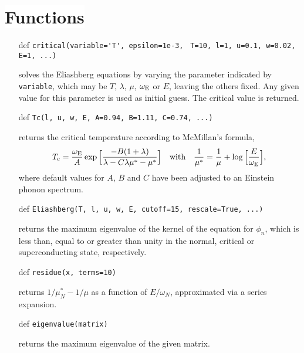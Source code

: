 \documentclass[a4paper]{article}
\def\sub#1{\sb{\mathrm{#1}}}
\def\headline#1{\section*{\normalsize\normalfont%
   \rlap{\rule[0.5ex]{\textwidth}{0.4pt}}\qquad\colorbox{white}{#1}}}
\begin{document}
   \headline{Functions}

   \begin{itemize}
      \item[def]
         \verb|critical(variable='T', epsilon=1e-3,|
         \verb| T=10, l=1, u=0.1, w=0.02, E=1, ...)|

      solves the Eliashberg equations by varying the parameter indicated by
      \verb|variable|, which may be $T$, $\lambda$, $\mu$, $\omega \sub E$ or
      $E$, leaving the others fixed. Any given value for this parameter is used
      as initial guess. The critical value is returned.

      \item[def] \verb|Tc(l, u, w, E, A=0.94, B=1.11, C=0.74, ...)|

      returns the critical temperature according to McMillan's formula,
      \begin{equation*}
         T \sub c = \frac {\omega \sub E} A \exp
         \Big[ \frac{-B (1 + \lambda)}{\lambda - C \lambda \mu^* - \mu^*} \Big]
         \quad \text{with} \quad
         \frac 1 {\mu^*} =
         \frac 1 \mu + \log \Big[ \frac E {\omega \sub E} \Big],
      \end{equation*}
      where default values for $A$, $B$ and $C$ have been adjusted to an
      Einstein phonon spectrum.

      \item[def] \verb|Eliashberg(T, l, u, w, E, cutoff=15, rescale=True, ...)|

      returns the maximum eigenvalue of the kernel of the equation for $\phi_n$,
      which is less than, equal to or greater than unity in the normal, critical
      or superconducting state, respectively.

      \item[def] \verb|residue(x, terms=10)|

      returns $1 / \mu^*_N - 1 / \mu$ as a function of $E / \omega_N$,
      approximated via a series expansion.

      \item[def] \verb|eigenvalue(matrix)|

      returns the maximum eigenvalue of the given matrix.
   \end{itemize}
\end{document}

